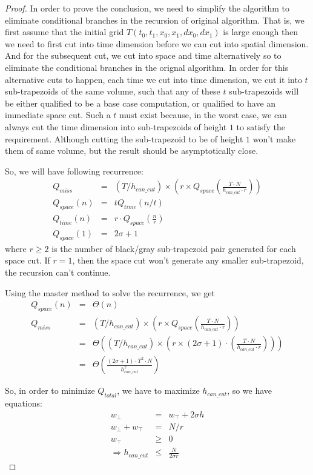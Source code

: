 \begin{proof}
In order to prove the conclusion, we need to simplify the algorithm to eliminate conditional branches 
in the recursion of original algorithm. That is, we first assume that the initial grid $T(t_0, t_1, x_0, x_1, dx_0, dx_1)$ is large enough then we need to first cut into time dimension before we can cut into spatial dimension. 
And for the subsequent cut, we cut into space and time alternatively so to eliminate the conditional branches in
the orignal algorithm. In order for this alternative cuts to happen, each time we cut into time dimension, we cut
it into $t$ sub-trapezoids of the same volume, such that any of these $t$ sub-trapezoids will be either qualified 
to be a base case computation, or qualified to have an immediate space cut. Such a $t$ must exist because, in the
worst case, we can always cut the time dimension into sub-trapezoids of height $1$ to satisfy the requirement. 
Although cutting the sub-trapezoid to be of height $1$ won't make them of same volume, but the result should be 
asymptotically close.

So, we will have following recurrence:
\begin{eqnarray}
Q_{miss} & = & (T/h_{can\_cut}) \times (r \times Q_{space}(\frac{T \cdot N}{h_{can\_cut} \cdot r})) \\
Q_{space}(n) & = & t Q_{time}(n/t) \\
Q_{time}(n) & = & r \cdot Q_{space}(\frac{n}{r}) \\
Q_{space}(1) & = & 2 \sigma + 1 \label{eq:rec1}
\end{eqnarray}
where $r \geq 2$ is the number of black/gray sub-trapezoid pair generated for each space cut. If $r = 1$, then
the space cut won't generate any smaller sub-trapezoid, the recursion can't continue.

Using the master method to solve the recurrence, we get
\begin{eqnarray}
Q_{space}(n) & = & \Theta (n) \\
Q_{miss} & = & (T/h_{can\_cut}) \times (r \times Q_{space}(\frac{T \cdot N}{h_{can\_cut} \cdot r})) \\
		  & = & \Theta ((T/h_{can\_cut}) \times (r \times (2 \sigma + 1) \cdot (\frac{T \cdot N}{h_{can\_cut} \cdot r}))) \\
		  & = & \Theta (\frac{(2 \sigma + 1) \cdot T^2 \cdot N}{h_{can\_cut}^2}) \label{eq:coTotal}
\end{eqnarray}

So, in order to minimize $Q_{total}$, we have to maximize $h_{can\_cut}$, so we have equations:
\begin{eqnarray}
w_{\bot} & = & w_{\top} + 2 \sigma h \\
w_{\bot} + w_{\top} & = & N/r \\
w_{\top} & \geq & 0 \\
\Rightarrow h_{can\_cut} & \leq & \frac{N}{2 \sigma r} \label{eq:coHCanCut}
\end{eqnarray}


\end{proof}
